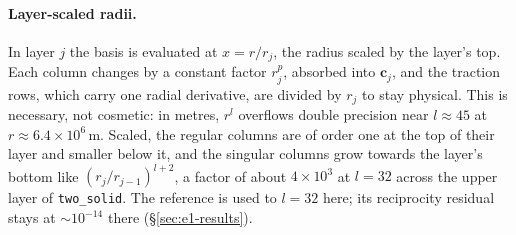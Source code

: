 \documentclass[11pt]{article}
\numberwithin{equation}{section}
\newcommand{\code}[1]{\texttt{#1}}
\begin{document}
\paragraph{Layer-scaled radii.} In layer $j$ the basis is evaluated at
$x=r/r_j$, the radius scaled by the layer's top. Each column changes by a
constant factor $r_j^{p}$, absorbed into $\mathbf c_j$, and the traction
rows, which carry one radial derivative, are divided by $r_j$ to stay
physical. This is necessary, not cosmetic: in metres, $r^{l}$ overflows
double precision near $l\approx45$ at $r\approx6.4\times10^6$\,m. Scaled,
the regular columns are of order one at the top of their layer and smaller
below it, and the singular columns grow towards the layer's bottom like
$(r_j/r_{j-1})^{l+2}$, a factor of about $4\times10^3$ at $l=32$ across the
upper layer of \code{two\_solid}. The reference is used to $l=32$ here; its
reciprocity residual stays at $\sim10^{-14}$ there
(\S\ref{sec:e1-results}).
\end{document}

